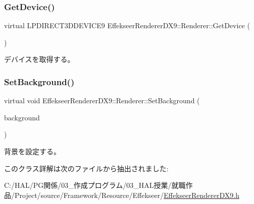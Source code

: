 \subsubsection{\texorpdfstring{Get\+Device()}{GetDevice()}}
{\footnotesize\ttfamily virtual L\+P\+D\+I\+R\+E\+C\+T3\+D\+D\+E\+V\+I\+C\+E9 Effekseer\+Renderer\+D\+X9\+::\+Renderer\+::\+Get\+Device (\begin{DoxyParamCaption}{ }\end{DoxyParamCaption})\hspace{0.3cm}{\ttfamily [pure virtual]}}



デバイスを取得する。 

\mbox{\label{class_effekseer_renderer_d_x9_1_1_renderer_a4ba4636b187f74288fdd6ff68071196d}} 
\subsubsection{\texorpdfstring{Set\+Background()}{SetBackground()}}
{\footnotesize\ttfamily virtual void Effekseer\+Renderer\+D\+X9\+::\+Renderer\+::\+Set\+Background (\begin{DoxyParamCaption}\item[{I\+Direct3\+D\+Texture9 $\ast$}]{background }\end{DoxyParamCaption})\hspace{0.3cm}{\ttfamily [pure virtual]}}



背景を設定する。 



このクラス詳解は次のファイルから抽出されました\+:\begin{DoxyCompactItemize}
\item 
C\+:/\+H\+A\+L/\+P\+G関係/03\+\_\+作成プログラム/03\+\_\+\+H\+A\+L授業/就職作品/\+Project/source/\+Framework/\+Resource/\+Effekseer/\mbox{\hyperlink{_effekseer_renderer_d_x9_8h}{Effekseer\+Renderer\+D\+X9.\+h}}\end{DoxyCompactItemize}
